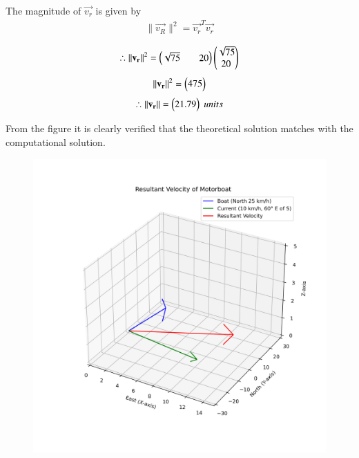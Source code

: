 \documentclass[journal]{IEEEtran}
\begin{document}
The magnitude of $\vec{v_r}$ is given by \\
\begin{align}
    \|\vec{v_R}\|^2=\vec{v_r}^T\vec{v_r}
\end{align}

\begin{align}
      \therefore\|\vec{v_r}\|^2=\begin{myvec}{\sqrt{75}&&20}\end{myvec}\begin{myvec}{\sqrt{75}\\20}
      \end{myvec}
\end{align}
\begin{align}
    \|\vec{v_r}\|^2=\myvec{475}
\end{align}
\begin{align}
    \therefore\|\vec{v_r}\|=\myvec{21.79} \;units
\end{align}
\newpage
\vspace*{0.25cm}

From the figure it is clearly verified that the theoretical solution matches with the computational solution.\\
\begin{figure}[h!]
    \centering
    \includegraphics[height=0.5\textheight, keepaspectratio]{figs/fig.png}
    \label{figure_1}
\end{figure}
 
\end{document}
